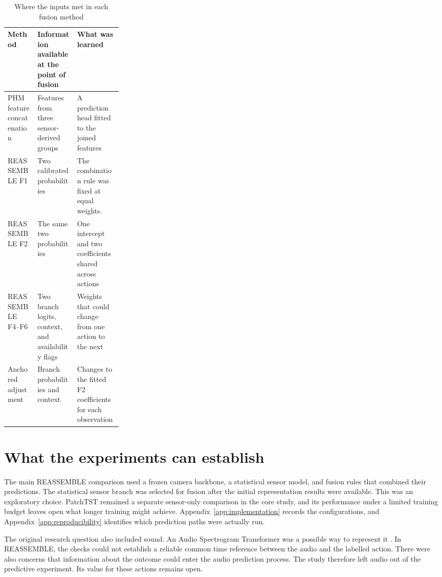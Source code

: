 \begin{table}[htbp]
\centering
\caption{Where the inputs met in each fusion method}
\label{tab:ch3-fusion-interfaces}
\small\singlespacing
\setlength{\tabcolsep}{4pt}
\renewcommand{\arraystretch}{1.15}
\begin{tabularx}{\linewidth}{@{}P{0.26\linewidth}YY@{}}
\toprule
\textbf{Method} & \textbf{Information available at the point of fusion} & \textbf{What
was learned} \\
\midrule
PHM feature concatenation & Features from three sensor-derived groups & A prediction
head fitted to the joined features \\
REASSEMBLE F1 & Two calibrated probabilities & The combination rule was fixed at equal weights. \\
REASSEMBLE F2 & The same two probabilities & One intercept and two coefficients shared
across actions \\
REASSEMBLE F4--F6 & Two branch logits, context, and availability flags & Weights that
could change from one action to the next \\
Anchored adjustment & Branch probabilities and context & Changes to the fitted F2
coefficients for each observation \\
\bottomrule
\end{tabularx}
\end{table}

\section{What the experiments can establish}

The main REASSEMBLE comparison used a frozen camera backbone, a statistical sensor
model, and fusion rules that combined their predictions. The statistical sensor branch
was selected for fusion after the initial representation results were available. This
was an exploratory choice. PatchTST remained a separate sensor-only comparison in the
core study, and its performance under a limited training budget leaves open what longer
training might achieve. Appendix~\ref{app:implementation} records the configurations,
and Appendix~\ref{app:reproducibility} identifies which prediction paths were actually
run.

The original research question also included sound. An Audio Spectrogram Transformer was
a possible way to represent it \parencite{P011}. In REASSEMBLE, the checks could not
establish a reliable common time reference between the audio and the labelled action.
There were also concerns that information about the outcome could enter the audio
prediction process. The study therefore left audio out of the predictive experiment. Its
value for these actions remains open.

